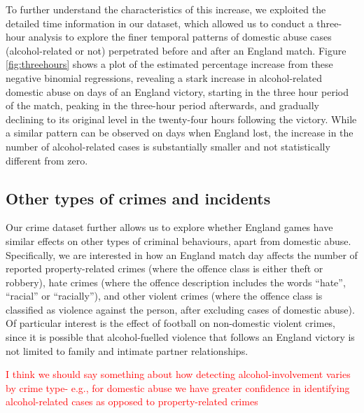 \documentclass[12pt, a4paper]{article}
\newcommand{\AT}[1]{\textcolor{red}{#1}}
\begin{document}
 To further understand the characteristics of this increase, we exploited the detailed time information in our dataset, which allowed us to conduct a three-hour analysis to explore the finer temporal patterns of domestic abuse cases (alcohol-related or not) perpetrated before and after an England match. Figure \ref{fig:threehours} shows a plot of the estimated percentage increase from these negative binomial regressions, revealing a stark increase in alcohol-related domestic abuse on days of an England victory, starting in the three hour period of the match, peaking in the three-hour period afterwards, and gradually declining to its original level in the twenty-four hours following the victory. While a similar pattern can be observed on days when England lost, the increase in the number of alcohol-related cases is substantially smaller and not statistically different from zero.

\subsection{Other types of crimes and incidents}

Our crime dataset further allows us to explore whether England games have similar effects on other types of criminal behaviours, apart from domestic abuse. Specifically, we are interested in how an England match day affects the number of reported property-related crimes (where the offence class is either theft or robbery), hate crimes (where the offence description includes the words ``hate'', ``racial'' or ``racially''), and other violent crimes (where the offence class is classified as violence against the person, after excluding cases of domestic abuse). Of particular interest is the effect of football on non-domestic violent crimes, since it is possible that alcohol-fuelled violence that follows an England victory is not limited to family and intimate partner relationships. 

\AT{I think we should say something about how detecting alcohol-involvement varies by crime type- e.g., for domestic abuse we have greater confidence in identifying alcohol-related cases as opposed to property-related crimes}
\end{document}
